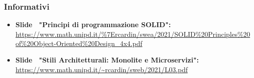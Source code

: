 \subsubsection{Informativi} \label{riferimenti_info}
\begin{itemize}
	\item \textbf{Slide \CR\  "Principi di programmazione SOLID":} \\ 
	\url{
	https://www.math.unipd.it/%
	\item \textbf{Slide \CR\  "Stili Architetturali: Monolite e Microservizi":} \\ 
	\url{https://www.math.unipd.it/~rcardin/sweb/2021/L03.pdf}
\end{itemize}